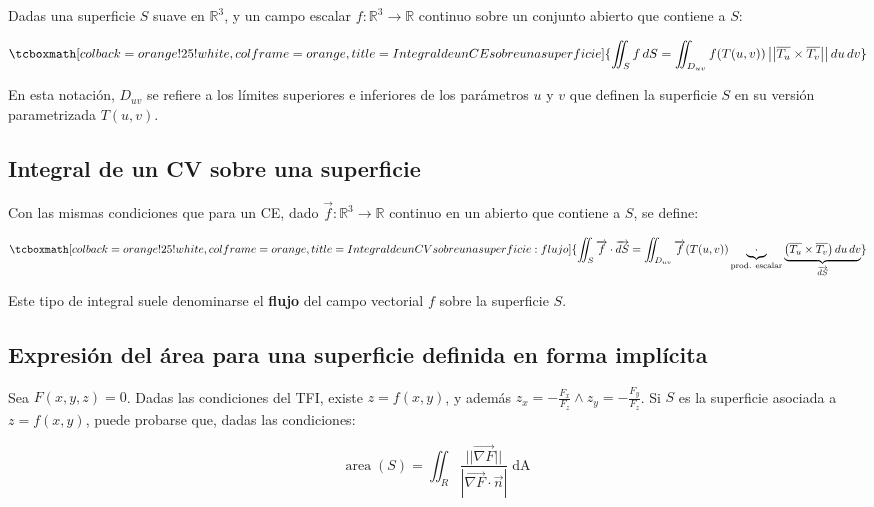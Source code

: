 \documentclass{article}
\renewcommand{\Bbb}{\mathbb}
\begin{document}
Dadas una superficie $S$ suave en $\Bbb R^3$, y un campo escalar $f:\Bbb R^3 \rightarrow \Bbb R$ continuo sobre un conjunto abierto que contiene a $S$:

\begin{equation}
\tcboxmath[colback=orange!25!white,colframe=orange, title=Integral de un CE sobre una superficie]
{ \iint_S f \mathop{dS} = \iint_{D_{uv}} f(T(u,v)) \left|\left| \overline{T_u} \times \overline{T_v} \right|\right| \mathop{du} \mathop{dv} }
\end{equation}

En esta notación, $D_{uv}$ se refiere a los límites superiores e inferiores de los parámetros $u$ y $v$ que definen la superficie $S$ en su versión parametrizada $T(u,v)$.

\subsection{Integral de un CV sobre una superficie}

Con las mismas condiciones que para un CE, dado $\overrightarrow{f}:\Bbb R^3 \rightarrow \Bbb R$ continuo en un abierto que contiene a $S$, se define:

\begin{equation}
\tcboxmath[colback=orange!25!white,colframe=orange, title=Integral de un CV sobre una superficie: flujo]
{ \iint_S \overrightarrow{f} \cdot \mathop{\overrightarrow{dS}} = \iint_{D_{uv}} \overrightarrow{f}(T(u,v)) \underbrace{\cdot}_{\text{prod. escalar}} \underbrace{ \left( \overline{T_u} \times \overline{T_v} \right) \mathop{du} \mathop{dv}}_{\mathop{\overrightarrow{dS}}} }
\end{equation}

Este tipo de integral suele denominarse el \textbf{flujo} del campo vectorial $f$ sobre la superficie $S$.

\subsection{Expresión del área para una superficie definida en forma implícita}

Sea $F(x,y,z) = 0$. Dadas las condiciones del TFI, existe $z = f(x,y)$, y además $z_x = -\frac{F_x}{F_z} \wedge z_y = -\frac{F_y}{F_z}$. Si $S$ es la superficie asociada a $z = f(x,y)$, puede probarse que, dadas las condiciones:

\begin{equation}
\mathop{area}(S) = \iint_{R} \frac{ || \overrightarrow{\nabla F}|| }{ | \overrightarrow{ \nabla F } \cdot \overrightarrow{n} | } \mathop{dA}
\end{equation}
\end{document}
